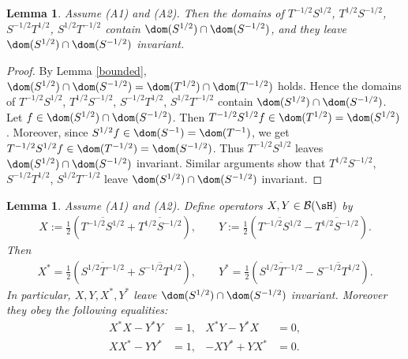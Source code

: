 \documentclass[12pt,draft]{article}
\theoremstyle{plain}
\newtheorem{lem}[theorem]{\bf Lemma}
\numberwithin{equation}{section}
\theoremstyle{remark}
\begin{document}
\begin{lem}\label{domain}
Assume (A1) and (A2). 
Then the domains of $T^{-1/2}S^{1/2}$, $T^{1/2}S^{-1/2}$, $S^{-1/2}T^{1/2}$, $S^{1/2}T^{-1/2}$ 
contain $\dom(S^{1/2})\cap\dom(S^{-1/2})$,
and they leave $\dom(S^{1/2})\cap\dom(S^{-1/2})$ invariant.
\end{lem}

\begin{proof}
By Lemma \ref{bounded}, $\dom(S^{1/2})\cap\dom(S^{-1/2})=\dom(T^{1/2})\cap\dom(T^{-1/2})$ holds.
Hence the domains of $T^{-1/2}S^{1/2}$, $T^{1/2}S^{-1/2}$, $S^{-1/2}T^{1/2}$, $S^{1/2}T^{-1/2}$ contain $\dom(S^{1/2})\cap\dom(S^{-1/2})$.
Let $f\in\dom(S^{1/2})\cap\dom(S^{-1/2})$.
Then $T^{-1/2}S^{1/2}f \in \dom(T^{1/2}) = \dom(S^{1/2})$. 
Moreover, since $S^{1/2}f \in \dom(S^{-1}) = \dom(T^{-1})$, we get $T^{-1/2}S^{1/2}f \in \dom(T^{-1/2}) = \dom(S^{-1/2})$.
Thus $T^{-1/2}S^{1/2}$ leaves $\dom(S^{1/2})\cap\dom(S^{-1/2})$ invariant.
Similar arguments show that $T^{1/2}S^{-1/2}$, $S^{-1/2}T^{1/2}$, $S^{1/2}T^{-1/2}$ leave $\dom(S^{1/2})\cap\dom(S^{-1/2})$ invariant.
\end{proof}

\begin{lem}\label{X and Y}
Assume (A1) and (A2).
Define operators $X,Y\in\mathcal{B}(\sH)$ by
\begin{align}
 X := \frac{1}{2} \left(\overline{T^{-1/2}S^{1/2}}+\overline{T^{1/2}S^{-1/2}}\right), \qquad 
 Y := \frac{1}{2}\left(\overline{T^{-1/2}S^{1/2}}-\overline{T^{1/2}S^{-1/2}}\right).
  \label{defXY}
\end{align}
Then 
\begin{align*}
 X^* = \frac{1}{2} \left(\overline{S^{1/2}T^{-1/2}}+\overline{S^{-1/2}T^{1/2}}\right), \qquad 
 Y^* = \frac{1}{2} \left(\overline{S^{1/2}T^{-1/2}}-\overline{S^{-1/2}T^{1/2}}\right).  
\end{align*}
In particular, $X, Y, X^*, Y^*$ leave $\dom(S^{1/2})\cap\dom(S^{-1/2})$ invariant.
Moreover they obey the following equalities:
\begin{align*}
 X^*X-Y^*Y &= 1, &  X^*Y-Y^*X &= 0,\\
 XX^*-YY^* &= 1, & -XY^*+YX^* &= 0.
\end{align*}
\end{lem}
\end{document}
